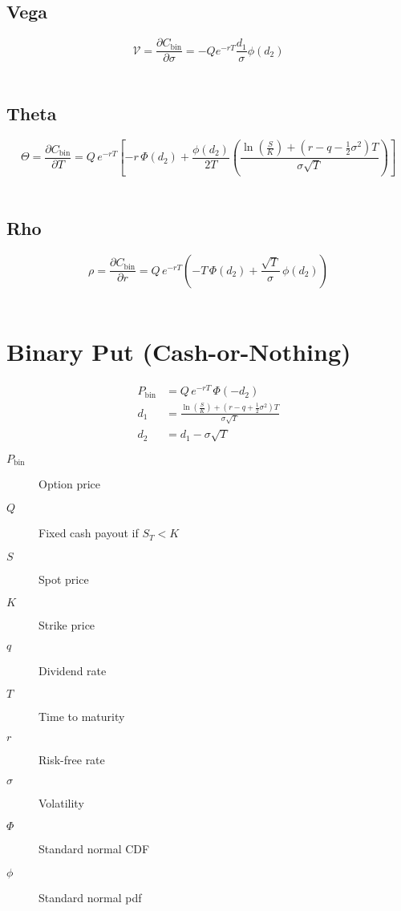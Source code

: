 \documentclass[12pt,a4paper]{article}
\begin{document}
\subsection{Vega}
\[
  \boxed{\mathcal{V} = \frac{\partial C_{\mathrm{bin}}}{\partial \sigma} = -Qe^{-rT}\frac{d_1}{\sigma}\phi(d_2)}
\]

\[
  \begin{aligned}
  \end{aligned}
\]

\subsection{Theta}
\[
  \boxed{\Theta = \frac{\partial C_{\mathrm{bin}}}{\partial T}
  = Q\, e^{-rT}\!\left[
  -r\,\Phi(d_2) 
  + \frac{\phi(d_2)}{2T}
    \left(
      \frac{\ln(\tfrac{S}{K}) + (r - q - \tfrac{1}{2}\sigma^2)T}{\sigma\sqrt{T}}
    \right)
  \right]}
\]

\[
  \begin{aligned}
  \end{aligned}
\]

\subsection{Rho}
\[
  \boxed{\rho = \frac{\partial C_{\mathrm{bin}}}{\partial r}
  = Q\, e^{-rT}\!\left(
    -T\,\Phi(d_2)
    + \frac{\sqrt{T}}{\sigma}\,\phi(d_2)
  \right)}
\]

\[
  \begin{aligned}
  \end{aligned}
\]

\newpage

\section{Binary Put (Cash-or-Nothing)}

\[
  \begin{aligned}
    P_{\mathrm{bin}} & = Q \, e^{-rT} \,\Phi(-d_2) \\ 
    d_1 & = \frac{\ln\!\left(\tfrac{S}{K}\right) + (r - q + \tfrac{1}{2}\sigma^2)T}{\sigma \sqrt{T}} \\
    d_2 & = d_1 - \sigma \sqrt{T}
  \end{aligned}
\]

\begin{description}
  \item[$P_{\mathrm{bin}}$] Option price
  \item[$Q$] Fixed cash payout if \( S_T < K \)
  \item[$S$] Spot price
  \item[$K$] Strike price
  \item[$q$] Dividend rate
  \item[$T$] Time to maturity
  \item[$r$] Risk-free rate
  \item[$\sigma$] Volatility
  \item[$\Phi$] Standard normal CDF
  \item[$\phi$] Standard normal pdf
\end{description}
\end{document}
